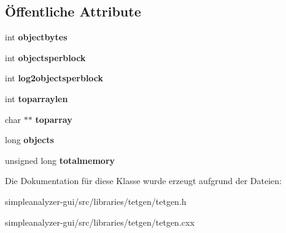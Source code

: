 \subsection*{Öffentliche Attribute}
\begin{DoxyCompactItemize}
\item 
\hypertarget{classtetgenmesh_1_1arraypool_a469ac2a2833a25faa0f99ab011122e2d}{int {\bfseries objectbytes}}\label{classtetgenmesh_1_1arraypool_a469ac2a2833a25faa0f99ab011122e2d}

\item 
\hypertarget{classtetgenmesh_1_1arraypool_a2b6ba46461d5c8f0e6043bdd111246dd}{int {\bfseries objectsperblock}}\label{classtetgenmesh_1_1arraypool_a2b6ba46461d5c8f0e6043bdd111246dd}

\item 
\hypertarget{classtetgenmesh_1_1arraypool_ab61ada3b2fc49879a160a919e9994279}{int {\bfseries log2objectsperblock}}\label{classtetgenmesh_1_1arraypool_ab61ada3b2fc49879a160a919e9994279}

\item 
\hypertarget{classtetgenmesh_1_1arraypool_aa9ced327d45678f31b4e7f8e75aff861}{int {\bfseries toparraylen}}\label{classtetgenmesh_1_1arraypool_aa9ced327d45678f31b4e7f8e75aff861}

\item 
\hypertarget{classtetgenmesh_1_1arraypool_a3a4e28a88226f1dd777773fe45094650}{char $\ast$$\ast$ {\bfseries toparray}}\label{classtetgenmesh_1_1arraypool_a3a4e28a88226f1dd777773fe45094650}

\item 
\hypertarget{classtetgenmesh_1_1arraypool_a23345232309fd68d2e3afa6d017299b0}{long {\bfseries objects}}\label{classtetgenmesh_1_1arraypool_a23345232309fd68d2e3afa6d017299b0}

\item 
\hypertarget{classtetgenmesh_1_1arraypool_af264f265d5752e75f50adea472ecd59f}{unsigned long {\bfseries totalmemory}}\label{classtetgenmesh_1_1arraypool_af264f265d5752e75f50adea472ecd59f}

\end{DoxyCompactItemize}


Die Dokumentation für diese Klasse wurde erzeugt aufgrund der Dateien\-:\begin{DoxyCompactItemize}
\item 
simpleanalyzer-\/gui/src/libraries/tetgen/tetgen.\-h\item 
simpleanalyzer-\/gui/src/libraries/tetgen/tetgen.\-cxx\end{DoxyCompactItemize}
